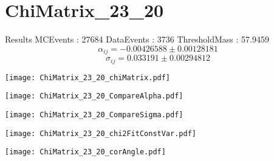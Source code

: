 \documentclass[a4paper,12pt]{article}
\begin{document}
\section{ChiMatrix\_23\_20}
\begin{minipage}{0.49\linewidth} Results \newline
MCEvents : 27684\newline
DataEvents : 3736 \newline
ThresholdMass : 57.9459\\
$$\alpha_{ij} = -0.00426588\pm 0.00128181$$
$$\sigma_{ij} = 0.033191\pm 0.00294812$$
\end{minipage}\hfill
\begin{minipage}{0.49\linewidth} 
\texttt{[image: ChiMatrix\_23\_20\_chiMatrix.pdf]}\\
\end{minipage}
\hfill
\begin{minipage}{0.49\linewidth} 
\texttt{[image: ChiMatrix\_23\_20\_CompareAlpha.pdf]}\\
\end{minipage}
\hfill
\begin{minipage}{0.49\linewidth} 
\texttt{[image: ChiMatrix\_23\_20\_CompareSigma.pdf]}\\
\end{minipage}
\begin{minipage}{0.49\linewidth} 
\texttt{[image: ChiMatrix\_23\_20\_chi2FitConstVar.pdf]}\\
\end{minipage}
\hfill
\begin{minipage}{0.49\linewidth} 
\texttt{[image: ChiMatrix\_23\_20\_corAngle.pdf]}\\
\end{minipage}
\end{document}
